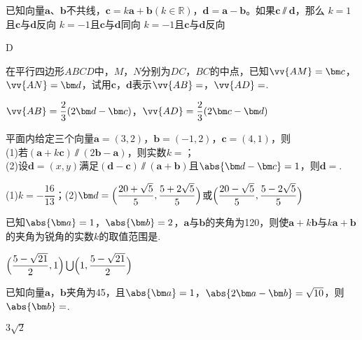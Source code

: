 \begin{Theorem}[平面向量基本定理]
\begin{exercise}
    \item%
      已知向量$\bm a$、$\bm b$不共线，$\bm c=k\bm a+\bm b({k\in\mathbb{R}})$，$\bm d=\bm a-\bm b$。如果$\bm c\varparallel \bm d$，那么\xz
        {$k=1$且$\bm c$与$\bm d$反向}
        {$k=-1$且$\bm c$与$\bm d$同向}
        {$k=-1$且$\bm c$与$\bm d$反向}
      \begin{answer}
        D
      \end{answer}
    \item%
      在平行四边形$ABCD$中，$M$，$N$分别为$DC$，$BC$的中点，已知$\vv{AM}=\bm c$，$\vv{AN}=\bm d$，试用$\bm c$，$\bm d$表示$\vv{AB}=$\tk，$\vv{AD}=$\tk.
      \begin{answer}
        $\vv{AB}=\dfrac{2}3(2\bm d-\bm c)$，$\vv{AD}=\dfrac{2}3(2\bm c-\bm d)$
      \end{answer}
    \item%
      平面内给定三个向量$\bm a=(3,2)$，$\bm b=(-1,2)$，$\bm c=(4,1)$，则\\
      (1)若$(\bm a+k\bm c)\varparallel(2\bm b-\bm a)$，则实数$k=$\tk；\\
      (2)设$\bm d=(x,y)$满足$(\bm d-\bm c) \varparallel (\bm a+\bm b)$且$\abs{\bm d-\bm c}=1$，则$\bm d=$\tk.
      \begin{answer}
        (1)$k=-\dfrac{16}{13}$；(2)$\bm d=\Bigl(\dfrac{20+\sqrt{5}}5,\dfrac{5+2\sqrt{5}}5\Bigr)$或$\Bigl(\dfrac{20-\sqrt{5}}5,\dfrac{5-2\sqrt{5}}5\Bigr)$
  \end{answer}
    \item%
      已知$\abs{\bm a}=1$，$\abs{\bm b}=2$，$\bm a$与$\bm b$的夹角为120\degree，则使$\bm a+k\bm b$与$k\bm a+\bm b$的夹角为锐角的实数$k$的取值范围是\tk.
      \begin{answer}
        $\Bigl(\dfrac{5-\sqrt{21}}2,1\Bigr) \bigcup \Bigl(1,\dfrac{5-\sqrt{21}}2 \Bigr)$
      \end{answer}
    \item%
      已知向量$\bm a$，$\bm b$夹角为45\degree，且$\abs{\bm a}=1$，$\abs{2\bm a-\bm b}=\sqrt{10}$，则$\abs{\bm b}=$\tk.
      \begin{answer}
        $3\sqrt{2}$

\end{answer}
\end{exercise}
\end{Theorem}
